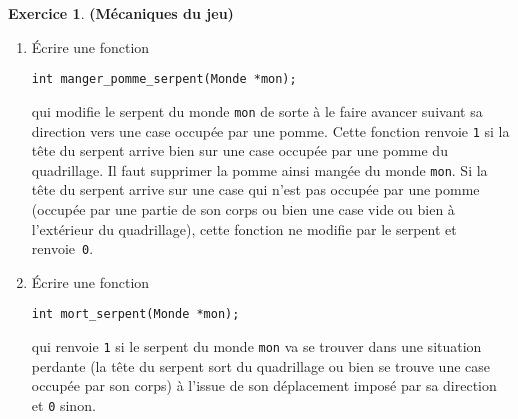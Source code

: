 \documentclass[12pt]{article}
\theoremstyle{definition}
\newtheorem{Exercice}{Exercice}
\begin{document}
\begin{Exercice} {\bf (Mécaniques du jeu)}
\begin{enumerate}
    \item Écrire une fonction
\begin{lstlisting}
int manger_pomme_serpent(Monde *mon);
\end{lstlisting}
    qui modifie le serpent du monde {\tt mon} de sorte à le faire avancer
    suivant sa direction vers une case occupée par une pomme. Cette fonction
    renvoie {\tt 1} si la tête du serpent arrive bien sur une case occupée
    par une pomme du quadrillage. Il faut supprimer la pomme ainsi
    mangée du monde {\tt mon}. Si la tête du serpent arrive sur une
    case qui n'est pas occupée par une pomme (occupée par une partie
    de son corps ou bien une case vide ou bien à l'extérieur du quadrillage),
    cette fonction ne modifie par le serpent et renvoie~{\tt 0}.
    \smallskip

    \item Écrire une fonction
\begin{lstlisting}
int mort_serpent(Monde *mon);
\end{lstlisting}
    qui renvoie {\tt 1} si le serpent du monde {\tt mon} va se trouver
    dans une situation perdante (la tête du serpent sort du quadrillage
    ou bien se trouve une case occupée par son corps) à l'issue de son
    déplacement imposé par sa direction et {\tt 0} sinon.
\end{enumerate}
\end{Exercice}
\bigskip
\end{document}

